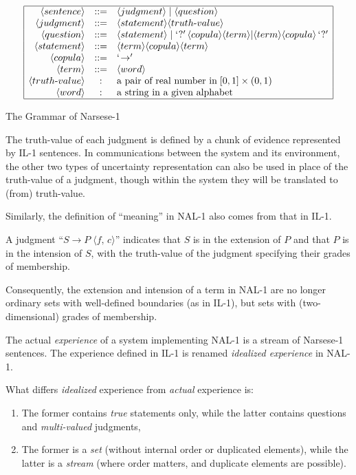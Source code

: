 \begin{table}[htb]
\[\begin{array}{|rcl|}
\hline
\langle sentence \rangle & ::= & \langle judgment \rangle \; | \; \langle question \rangle  \\
\langle judgment \rangle & ::= & \langle statement \rangle \langle truth \mbox{-} value \rangle  \\
\langle question \rangle & ::= & \langle statement \rangle \; | \; `?' \, \langle  copula \rangle \langle term \rangle 
                         | \langle  term \rangle  \langle  copula \rangle \, `?' \\
\langle statement \rangle  & ::= & \langle  term \rangle  \langle  copula \rangle  \langle  term \rangle   \\
\langle copula \rangle  & ::= & `\!\rightarrow' \\
\langle term \rangle  & ::= & \langle word \rangle  \\
\langle truth \mbox{-} value \rangle & : & \mbox{a pair of real number in} \; [0, 1] \times(0, 1) \\
\langle word \rangle  & : & \mbox{a string in a given alphabet} \\
\hline
\end{array} \]
\caption{The Grammar of Narsese-1}
\label{Narsese-1}
\end{table}

The truth-value of each judgment is defined by a chunk of evidence represented by IL-1 sentences. In communications between the system and its environment, the other two types of uncertainty representation can also be used in place of the truth-value of a judgment, though within the system they will be translated to (from) truth-value. 

Similarly, the definition of ``meaning'' in NAL-1 also comes from that in IL-1.
\begin{defi} 
A judgment ``\(S \rightarrow P \; \langle f, \, c\rangle \)'' indicates that $S$ is in the extension of $P$ and that $P$ is in the intension of $S$, with the truth-value of the judgment specifying their grades of membership.
\end{defi}
Consequently, the extension and intension of a term in NAL-1 are no longer ordinary sets with well-defined boundaries (as in IL-1), but sets with (two-dimensional) grades of membership.

\begin{defi} 
The actual \emph{experience} of a system implementing NAL-1 is a stream of Narsese-1 sentences. The experience defined in IL-1 is renamed \emph{idealized experience} in NAL-1.
\end{defi}
What differs \emph{idealized} experience from \emph{actual} experience is:
\begin{enumerate}
	\item The former contains \emph{true} statements only, while the latter contains questions and \emph{multi-valued} judgments,
	\item The former is a \emph{set} (without internal order or duplicated elements), while the latter is a \emph{stream} (where order matters, and duplicate elements are possible).
\end{enumerate}

